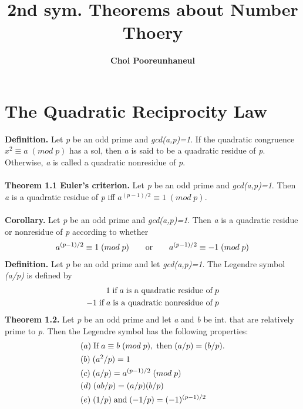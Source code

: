 \documentclass[a4paper,10pt]{article}
\author{\textbf{Choi Pooreunhaneul}}
\title{\textbf{2nd sym. Theorems about Number Thoery}}
\begin{document}
\maketitle

\section{The Quadratic Reciprocity Law}
\textbf{Definition.} Let \textit{p} be an odd prime and \textit{gcd(a,p)=1}. If the quadratic congruence \textit{$x^{2}\equiv a \; (mod \; p)$} has a sol, then \textit{a} is said to be a quadratic residue of \textit{p}. Otherwise, \textit{a} is called a quadratic nonresidue of \textit{p}. \\ \\
\textbf{Theorem 1.1 Euler's criterion.} Let \textit{p} be an odd prime and \textit{gcd(a,p)=1}. Then \textit{a} is a quadratic residue of \textit{p} iff \textit{$a^{(p-1)/2}\equiv1 \; (mod \; p)$}. \\ \\
\textbf{Corollary.} Let \textit{p} be an odd prime and \textit{gcd(a,p)=1}. Then \textit{a} is a quadratic residue or nonresidue of \textit{p} according to whether
\begin{align}
a^{(p-1)/2}\equiv1 \; (mod \; p) \qquad \textnormal{or} \qquad a^{(p-1)/2}\equiv-1 \; (mod \; p)
\end{align}
\textbf{Definition.} Let \textit{p} be an odd prime and let \textit{gcd(a,p)=1}. The Legendre symbol \textit{(a/p)} is defined by
\begin{align}
1 \; \textnormal{if} \; a \; \textnormal{is a quadratic residue of} \; p \\
-1 \; \textnormal{if} \; a \; \textnormal{is a quadratic nonresidue of} \; p 
\end{align}
\textbf{Theorem 1.2.} Let \textit{p} be an odd prime and let \textit{a} and \textit{b} be int. that are relatively prime to \textit{p}. Then the Legendre symbol has the following properties:
\begin{align}
&(a) \; \textnormal{If} \; a\equiv b \; (mod \; p), \; \textnormal{then} \; (a/p)=(b/p). \\
&(b) \; (a^{2}/p)=1 \\ 
&(c) \; (a/p)=a^{(p-1)/2} \; (mod \; p) \\
&(d) \; (ab/p)=(a/p)(b/p) \\
&(e) \; (1/p) \; \textnormal{and} \; (-1/p)=(-1)^{(p-1)/2}
\end{align}
\end{document}
